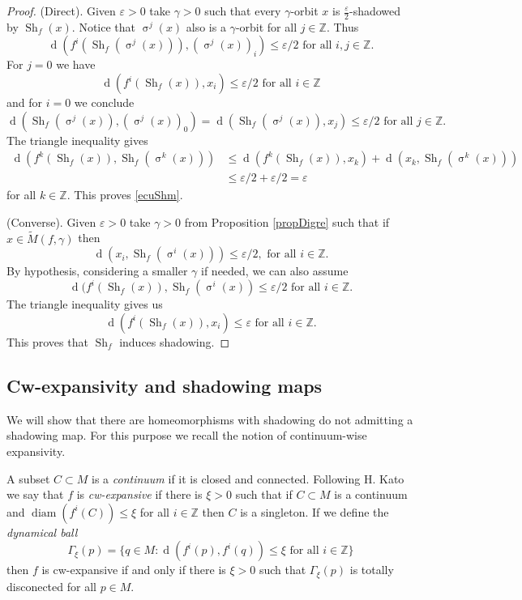 \documentclass[12pt]{amsart}
\DeclareMathOperator{\shift}{\sigma}
\theoremstyle{plain}
\theoremstyle{definition}
\theoremstyle{remark}
\DeclareMathOperator{\diam}{diam}
\DeclareMathOperator{\dist}{d}
\DeclareMathOperator{\shm}{Sh}
\newcommand{\Z}{\mathbb Z}
\renewcommand{\epsilon}{\varepsilon}
\newcommand{\expc}{\xi}
\newcommand{\tM}{\tilde{M}}
\begin{document}
\begin{proof}
	(Direct). Given $\epsilon>0$ take $\gamma>0$ such that
	every $\gamma$-orbit $x$ is $\frac{\epsilon}{2}$-shadowed by $\shm_f(x)$.
	Notice that $\shift^j(x)$ also is a $\gamma$-orbit for all $j\in\Z$.
	Thus
	\[
	\dist(f^i(\shm_f(\shift^j(x))),(\shift^j(x))_i)\leq\epsilon/2
	\text{ for all }i,j\in\Z.
	\]
	For $j=0$ we have
	\[
	\dist(f^i(\shm_f(x)),x_i)\leq\epsilon/2\text{ for all }i\in\Z
	\]
	and for $i=0$ we conclude
	\[
	\dist(\shm_f(\shift^j(x)),(\shift^j(x))_0)=
	\dist(\shm_f(\shift^j(x)),x_j)\leq\epsilon/2
	\text{ for all }j\in\Z.
	\]
	The triangle inequality gives
	\[
	\begin{array}{rl}
		\dist(f^k(\shm_f(x)),\shm_f(\shift^k(x)))& \leq
		\dist(f^k(\shm_f(x)),x_k)+
		\dist(x_k,\shm_f(\shift^k(x)))\\
		&\leq \epsilon/2+\epsilon/2=\epsilon
	\end{array}
	\]
	for all $k\in\Z$. This proves \eqref{ecuShm}.

	(Converse). Given $\epsilon>0$ take $\gamma>0$ from Proposition \ref{propDigre}
	such that if $x\in \tM(f,\gamma)$ then
	$$\dist(x_i,\shm_f(\shift^i(x)))\leq\epsilon/2,\text{ for all }i\in\Z.$$
	By hypothesis, considering a smaller $\gamma$ if needed, we can also assume
	$$\dist(f^i(\shm_f(x)),\shm_f(\shift^i(x))\leq\epsilon/2\text{ for all }i\in\Z.$$
	The triangle inequality gives us
	$$\dist(f^i(\shm_f(x)),x_i)\leq\epsilon\text{ for all }i\in\Z.$$
	This proves that $\shm_f$ induces shadowing.
\end{proof}

\subsection{Cw-expansivity and shadowing maps}
\label{Expansivity and shadowing maps}

We will show that there are homeomorphisms with shadowing do not admitting a shadowing map.
For this purpose we recall the notion of continuum-wise expansivity.

A subset $C\subset M$ is a \textit{continuum} if it is closed and connected.
Following H. Kato we say that $f$ is \textit{cw-expansive} if there is $\expc>0$
such that if $C\subset M$ is a continuum and $\diam(f^i(C))\leq\expc$ for all
$i\in\Z$ then $C$ is a singleton.
If we define the \textit{dynamical ball}
\[
\Gamma_\expc(p)=\{q\in M:\dist(f^i(p),f^i(q))\leq\expc\text{ for all }i\in\Z\}
\]
then $f$ is cw-expansive if and only if there is $\expc>0$ such that
$\Gamma_\expc(p)$ is totally disconected for all $p\in M$.
\end{document}
